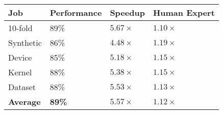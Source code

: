 \begin{tabular}{llll}
  \toprule
  Job & Performance & Speedup & Human Expert \\
  \midrule
  10-fold & 89\% &       $5.67\times$ &       $1.10\times$ \\
  Synthetic & 86\% &       $4.48\times$ &       $1.19\times$ \\
  Device & 85\% &       $5.18\times$ &       $1.15\times$ \\
  Kernel & 88\% &       $5.38\times$ &       $1.15\times$ \\
  Dataset & 88\% &       $5.53\times$ &       $1.13\times$ \\
  \textbf{Average} &  \textbf{89\%} &  $\bm{5.57\times}$ &  $\bm{1.12\times}$ \\
  \bottomrule
\end{tabular}

